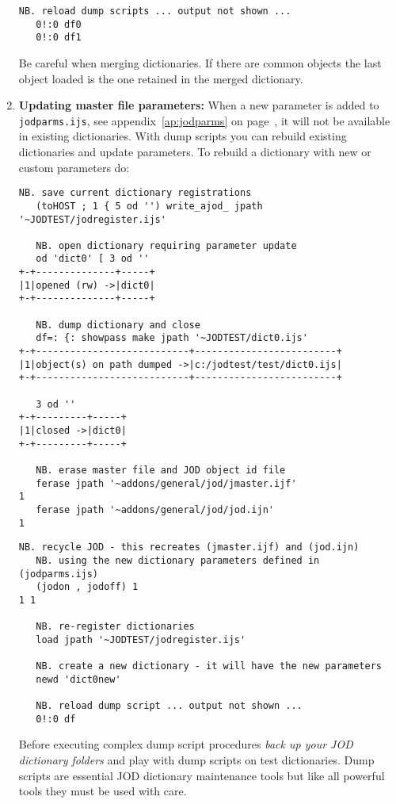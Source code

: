 \begin{enumerate}
\begin{lstlisting}[frame=single,framerule=0pt,basicstyle=\ttfamily\footnotesize]
   NB. reload dump scripts ... output not shown ...  
   0!:0 df0  
   0!:0 df1
\end{lstlisting}

Be careful when merging dictionaries. If there are common objects the last object loaded is the one
retained in the merged dictionary.


\item \textbf{Updating master file parameters:} When a new parameter is added to \texttt{jodparms.ijs}, 
see appendix~\ref{ap:jodparms} on page~\pageref{ap:jodparms}, it will not be available in existing dictionaries.
With dump scripts you can rebuild existing dictionaries and update parameters. To rebuild a dictionary with
new or custom parameters do:

\begin{lstlisting}[frame=single,framerule=0pt,basicstyle=\ttfamily\footnotesize]
   NB. save current dictionary registrations
   (toHOST ; 1 { 5 od '') write_ajod_ jpath '~JODTEST/jodregister.ijs'
   
   NB. open dictionary requiring parameter update 
   od 'dict0' [ 3 od ''
+-+--------------+-----+
|1|opened (rw) ->|dict0|
+-+--------------+-----+
   
   NB. dump dictionary and close
   df=: {: showpass make jpath '~JODTEST/dict0.ijs'
+-+---------------------------+-------------------------+
|1|object(s) on path dumped ->|c:/jodtest/test/dict0.ijs|
+-+---------------------------+-------------------------+

   3 od ''
+-+---------+-----+
|1|closed ->|dict0|
+-+---------+-----+

   NB. erase master file and JOD object id file
   ferase jpath '~addons/general/jod/jmaster.ijf'
1
   ferase jpath '~addons/general/jod/jod.ijn'
1
\end{lstlisting}

\newpage

\begin{lstlisting}[frame=single,framerule=0pt,basicstyle=\ttfamily\footnotesize]
   NB. recycle JOD - this recreates (jmaster.ijf) and (jod.ijn) 
   NB. using the new dictionary parameters defined in (jodparms.ijs)   
   (jodon , jodoff) 1
1 1

   NB. re-register dictionaries
   load jpath '~JODTEST/jodregister.ijs'

   NB. create a new dictionary - it will have the new parameters
   newd 'dict0new'
   
   NB. reload dump script ... output not shown ...
   0!:0 df  
\end{lstlisting}

Before executing complex dump script procedures \emph{back up your JOD dictionary folders} and play with 
dump scripts on test dictionaries. Dump scripts are essential JOD dictionary maintenance tools but like
all powerful tools they must be used with care. 


\end{enumerate} 

